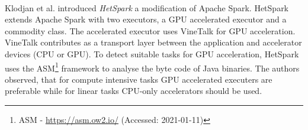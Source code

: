 \paragraph{}
Klodjan et al. \cite{Klodjan2018HetSpark} introduced \textit{HetSpark} a modification of Apache Spark.
HetSpark extends Apache Spark with two executors, a GPU accelerated executor and a commodity class. 
The accelerated executor uses VineTalk\cite{Mavridis2017VineTalk} for GPU acceleration.
VineTalk contributes as a transport layer between the application and accelerator devices (CPU or GPU).
To detect suitable tasks for GPU acceleration, HetSpark uses the ASM\footnote{ASM - \url{https://asm.ow2.io/} (Accessed: 2021-01-11)} framework to analyse the byte code of Java binaries.
The authors observed, that for compute intensive tasks GPU accelerated executers are preferable while for linear tasks CPU-only accelerators should be used.


